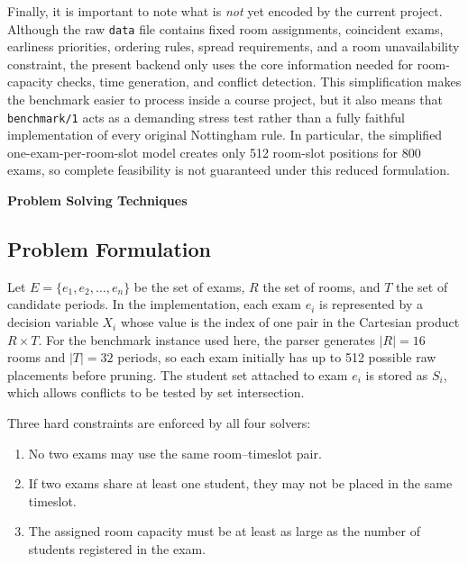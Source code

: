 Finally, it is important to note what is \emph{not} yet encoded by the
current project. Although the raw \texttt{data} file contains fixed room
assignments, coincident exams, earliness priorities, ordering rules,
spread requirements, and a room unavailability constraint, the present
backend only uses the core information needed for room-capacity checks,
time generation, and conflict detection. This simplification makes the
benchmark easier to process inside a course project, but it also means
that \texttt{benchmark/1} acts as a demanding stress test rather than a
fully faithful implementation of every original Nottingham rule. In
particular, the simplified one-exam-per-room-slot model creates only 512
room-slot positions for 800 exams, so complete feasibility is not
guaranteed under this reduced formulation.

\newpage
{}
{}
{\large\bfseries Problem Solving Techniques}
\vspace{2pt}
\titlerule
\vspace{6pt}

\subsection{Problem Formulation}

Let $E = \{e_1, e_2, \dots, e_n\}$ be the set of exams, $R$ the set of
rooms, and $T$ the set of candidate periods. In the implementation, each
exam $e_i$ is represented by a decision variable $X_i$ whose value is
the index of one pair in the Cartesian product $R \times T$. For the
benchmark instance used here, the parser generates $|R| = 16$ rooms and
$|T| = 32$ periods, so each exam initially has up to 512 possible raw
placements before pruning. The student set attached to exam $e_i$ is
stored as $S_i$, which allows conflicts to be tested by set
intersection.

Three hard constraints are enforced by all four solvers:
\begin{enumerate}[leftmargin=1.2cm]
  \item No two exams may use the same room--timeslot pair.
  \item If two exams share at least one student, they may not be placed
  in the same timeslot.
  \item The assigned room capacity must be at least as large as the
  number of students registered in the exam.
\end{enumerate}

